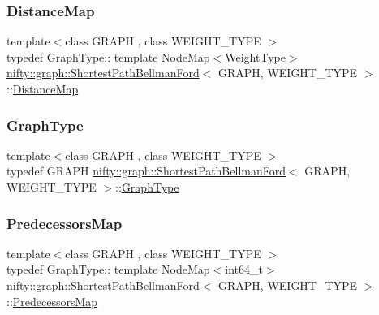 \subsubsection{\texorpdfstring{Distance\+Map}{DistanceMap}}
{\footnotesize\ttfamily template$<$class G\+R\+A\+PH , class W\+E\+I\+G\+H\+T\+\_\+\+T\+Y\+PE $>$ \\
typedef Graph\+Type\+:: template Node\+Map$<$\hyperlink{classnifty_1_1graph_1_1ShortestPathBellmanFord_a0455c814a964983fe8b43278bb7528e8}{Weight\+Type}$>$ \hyperlink{classnifty_1_1graph_1_1ShortestPathBellmanFord}{nifty\+::graph\+::\+Shortest\+Path\+Bellman\+Ford}$<$ G\+R\+A\+PH, W\+E\+I\+G\+H\+T\+\_\+\+T\+Y\+PE $>$\+::\hyperlink{classnifty_1_1graph_1_1ShortestPathBellmanFord_a00b64f4bc8316d99c4f029b2b37da74c}{Distance\+Map}}

\mbox{\label{classnifty_1_1graph_1_1ShortestPathBellmanFord_a927d9f2cee4c4f0f6e87df05de2af6bb}} 
\subsubsection{\texorpdfstring{Graph\+Type}{GraphType}}
{\footnotesize\ttfamily template$<$class G\+R\+A\+PH , class W\+E\+I\+G\+H\+T\+\_\+\+T\+Y\+PE $>$ \\
typedef G\+R\+A\+PH \hyperlink{classnifty_1_1graph_1_1ShortestPathBellmanFord}{nifty\+::graph\+::\+Shortest\+Path\+Bellman\+Ford}$<$ G\+R\+A\+PH, W\+E\+I\+G\+H\+T\+\_\+\+T\+Y\+PE $>$\+::\hyperlink{classnifty_1_1graph_1_1ShortestPathBellmanFord_a927d9f2cee4c4f0f6e87df05de2af6bb}{Graph\+Type}}

\mbox{\label{classnifty_1_1graph_1_1ShortestPathBellmanFord_a9eca03af1ee4e886ed7da46dae5d5703}} 
\subsubsection{\texorpdfstring{Predecessors\+Map}{PredecessorsMap}}
{\footnotesize\ttfamily template$<$class G\+R\+A\+PH , class W\+E\+I\+G\+H\+T\+\_\+\+T\+Y\+PE $>$ \\
typedef Graph\+Type\+:: template Node\+Map$<$int64\+\_\+t$>$ \hyperlink{classnifty_1_1graph_1_1ShortestPathBellmanFord}{nifty\+::graph\+::\+Shortest\+Path\+Bellman\+Ford}$<$ G\+R\+A\+PH, W\+E\+I\+G\+H\+T\+\_\+\+T\+Y\+PE $>$\+::\hyperlink{classnifty_1_1graph_1_1ShortestPathBellmanFord_a9eca03af1ee4e886ed7da46dae5d5703}{Predecessors\+Map}}

